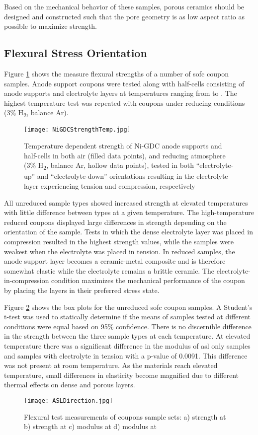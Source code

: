 Based on the mechanical behavior of these samples, porous ceramics should be designed and constructed such that the pore geometry is as low aspect ratio as possible to maximize strength.

\subsection{Flexural Stress Orientation}

Figure \ref{fig:NiGDCHalfCells} shows the measure flexural strengths of a number of \gls{sofc} coupon samples.
Anode support coupons were tested along with half-cells consisting of anode supports and electrolyte layers at temperatures ranging from  to .
The highest temperature test was repeated with coupons under reducing conditions (3\% H\textsubscript{2}, balance Ar).
\begin{figure}
    \texttt{[image: NiGDCStrengthTemp.jpg]}
    \caption{Temperature dependent strength of Ni-GDC anode supports and half-cells in both air (filled data points), and reducing atmosphere (3\% H\textsubscript{2}, balance Ar, hollow data points), tested in both ``electrolyte-up'' and ``electrolyte-down'' orientations resulting in the electrolyte layer experiencing tension and compression, respectively}
    \label{fig:NiGDCHalfCells}
\end{figure}

All unreduced sample types showed increased strength at elevated temperatures with little difference between types at a given temperature.
The high-temperature reduced coupons displayed large differences in strength depending on the orientation of the sample.
Tests in which the dense electrolyte layer was placed in compression resulted in the highest strength values, while the samples were weakest when the electrolyte was placed in tension.
In reduced samples, the anode support layer becomes a ceramic-metal composite and is therefore somewhat elastic while the electrolyte remains a brittle ceramic.
The electrolyte-in-compression condition maximizes the mechanical performance of the coupon by placing the layers in their preferred stress state.

Figure \ref{fig:ASLDirection} shows the box plots for the unreduced \gls{sofc} coupon samples.
A Student's t-test was used to statically determine if the means of samples tested at different conditions were equal based on 95\% confidence.
There is no discernible difference in the strength between the three sample types at each temperature.
At elevated temperature there was a significant difference in the modulus of \gls{asl} only samples and samples with electrolyte in tension with a p-value of 0.0091.
This difference was not present at room temperature.
As the materials reach elevated temperature, small differences in elasticity become magnified due to different thermal effects on dense and porous layers.
\begin{figure}
    \texttt{[image: ASLDirection.jpg]}
    \caption{Flexural test measurements of coupons sample sets: a) strength at  b) strength at  c) modulus at  d) modulus at }
    \label{fig:ASLDirection}
\end{figure}

